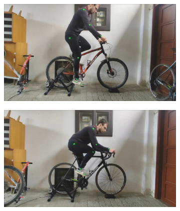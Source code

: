 \begin{figure}[htbp]
    \begin{subfigure}[b]{\imgwidth}
        \centering

        \includegraphics[width=1\linewidth]{obrazky-figures/4.png}

    \end{subfigure}
    \hfill
    \begin{subfigure}[b]{\imgwidth}
        \centering

        \includegraphics[width=1\linewidth]{obrazky-figures/5.png}

    \end{subfigure}
    \hfill
    \begin{subfigure}[b]{\imgwidth}
        \centering


\end{subfigure}
\end{figure}
